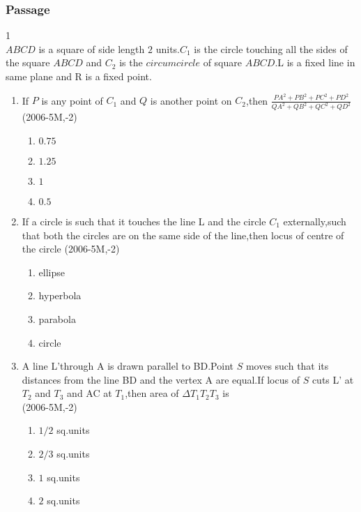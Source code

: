 \documentclass[journal,12pt,twocolumn]{IEEEtran}
\theoremstyle{remark}
\begin{document}
\subsubsection{Passage }
1\\
$ABCD$ is a square of side length $2$ units.$C_1$ is the circle touching all the sides of the square $ABCD$ and $C_2$ is the $circumcircle$ of square $ABCD$.L is a fixed line in same plane and R is a fixed point.\\
\begin{enumerate}
\item If $P$ is any point of $C_1$ and $Q$ is another point on $C_2$,then $\frac{PA^2+PB^2+PC^2+PD^2}{QA^2+QB^2+QC^2+QD^2}$\\
\hfill (2006-5M,-2)\\
\begin{enumerate}
\item $0.75$\\
\item $1.25$\\
\item $1$\\
\item $0.5$\\
\end{enumerate}
\item If a circle is such that it touches the line L and the circle $C_1$ externally,such that both the circles are on the same side of the line,then locus of centre of the circle 
\hfill(2006-5M,-2)
\begin{enumerate}
\item ellipse\\
\item hyperbola\\
\item parabola\\
\item circle\\
\end{enumerate}
\item A line L'through A is drawn parallel to BD.Point $S$ moves such that its distances from the line BD and the vertex A are equal.If locus of $S$ cuts L' at $T_2$ and $T_3$ and AC at $T_1$,then area of $\Delta T_1T_2T_3$ is\\
\hfill(2006-5M,-2)\\
\begin{enumerate}
\item $1/2$ sq.units\\
\item $2/3$ sq.units\\
\item $1$ sq.units\\
\item $2$ sq.units\\
\end{enumerate}

\end{enumerate}
\end{document}
